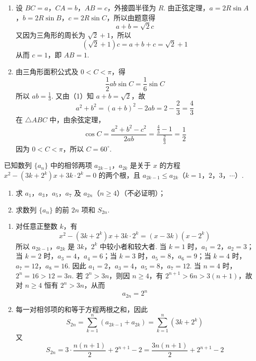\begin{solution}
\begin{enumerate}
\item 设 \(BC=a\)，\(CA=b\)，\(AB=c\)，外接圆半径为 \(R\). 由正弦定理，\(a=2R\sin A\)，\(b=2R\sin B\)，\(c=2R\sin C\)，所以由题意得
\[
a+b=\sqrt{2}c
\]
又因为三角形的周长为 \(\sqrt{2}+1\)，所以
\[
(\sqrt{2}+1)c=a+b+c=\sqrt{2}+1
\]
从而 \(c=1\)，即 \(AB=1\).

\item 由三角形面积公式及 \(0<C<\pi\)，得
\[
\frac{1}{2}ab\sin C=\frac{1}{6}\sin C
\]
所以 \(ab=\frac{1}{3}\). 又由（1）知 \(a+b=\sqrt{2}\)，故
\[
a^2+b^2=(a+b)^2-2ab=2-\frac{2}{3}=\frac{4}{3}
\]
在 \(\triangle ABC\) 中，由余弦定理，
\[
\cos C=\frac{a^2+b^2-c^2}{2ab}=\frac{\frac{4}{3}-1}{\frac{2}{3}}=\frac{1}{2}
\]
因为 \(0<C<\pi\)，所以 \(C=60^{\circ}\).
\end{enumerate}
\end{solution}

\begin{problem}
已知数列 \(\{a_{n}\}\) 中的相邻两项 \(a_{2k-1}\)，\(a_{2k}\) 是关于 \(x\) 的方程 \(x^2 - (3k + 2^k)x + 3k \cdot 2^k = 0\) 的两个根，且 \(a_{2k-1} \leqslant a_{2k}\)（\(k=1\)，\(2\)，\(3\)，\(\cdots\)）.

\begin{enumerate}
\item 求 \(a_{1}\)，\(a_{3}\)，\(a_{5}\)，\(a_{7}\) 及 \(a_{2n}\)（\(n \geqslant 4\)）（不必证明）；
\item 求数列 \(\{a_{n}\}\) 的前 \(2n\) 项和 \(S_{2n}\).
\end{enumerate}
\end{problem}

\begin{solution}
\begin{enumerate}
\item 对任意正整数 \(k\)，有
\[
x^2-(3k+2^k)x+3k\cdot 2^k=(x-3k)(x-2^k)
\]
所以 \(a_{2k-1}\)，\(a_{2k}\) 是 \(3k\)，\(2^k\) 中较小者和较大者.
当 \(k=1\) 时，\(a_1=2\)，\(a_2=3\)；当 \(k=2\) 时，\(a_3=4\)，\(a_4=6\)；当 \(k=3\) 时，\(a_5=8\)，\(a_6=9\)；当 \(k=4\) 时，\(a_7=12\)，\(a_8=16\).
因此 \(a_1=2\)，\(a_3=4\)，\(a_5=8\)，\(a_7=12\).
当 \(n=4\) 时，\(2^n=16>12=3n\). 若 \(2^n>3n\)，则因 \(n\geqslant4\)，有 \(2^{n+1}>6n>3(n+1)\)，故对 \(n\geqslant4\) 恒有 \(2^n>3n\)，从而
\[
a_{2n}=2^n
\]

\item 每一对相邻项的和等于方程两根之和，因此
\[
S_{2n}=\sum_{k=1}^{n}(a_{2k-1}+a_{2k})=\sum_{k=1}^{n}(3k+2^k)
\]
又
\[
S_{2n}=3\cdot\frac{n(n+1)}{2}+2^{n+1}-2=\frac{3n(n+1)}{2}+2^{n+1}-2
\]
\end{enumerate}
\end{solution}

